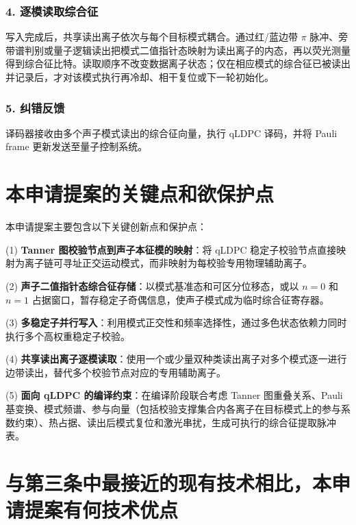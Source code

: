 \documentclass[12pt,a4paper]{article}
\begin{document}
\subsubsection{4. 逐模读取综合征}
写入完成后，共享读出离子依次与每个目标模式耦合。通过红/蓝边带 $\pi$ 脉冲、旁带谱判别或量子逻辑读出把模式二值指针态映射为读出离子的内态，再以荧光测量得到综合征比特。读取顺序不改变数据离子状态；仅在相应模式的综合征已被读出并记录后，才对该模式执行再冷却、相干复位或下一轮初始化。

\subsubsection{5. 纠错反馈}
译码器接收由多个声子模式读出的综合征向量，执行 qLDPC 译码，并将 Pauli frame 更新发送至量子控制系统。

\section{本申请提案的关键点和欲保护点}

本申请提案主要包含以下关键创新点和保护点：

(1) \textbf{Tanner 图校验节点到声子本征模的映射}：将 qLDPC 稳定子校验节点直接映射为离子链可寻址正交运动模式，而非映射为每校验专用物理辅助离子。

(2) \textbf{声子二值指针态综合征存储}：以模式基准态和可区分位移态，或以 $n=0$ 和 $n=1$ 占据窗口，暂存稳定子奇偶信息，使声子模式成为临时综合征寄存器。

(3) \textbf{多稳定子并行写入}：利用模式正交性和频率选择性，通过多色状态依赖力同时执行多个高权重稳定子校验。

(4) \textbf{共享读出离子逐模读取}：使用一个或少量双种类读出离子对多个模式逐一进行边带读出，替代多个校验节点对应的专用辅助离子。

(5) \textbf{面向 qLDPC 的编译约束}：在编译阶段联合考虑 Tanner 图重叠关系、Pauli 基变换、模式频谱、参与向量（包括校验支撑集合内各离子在目标模式上的参与系数约束）、热占据、读出后模式复位和激光串扰，生成可执行的综合征提取脉冲表。

\section{与第三条中最接近的现有技术相比，本申请提案有何技术优点}
\end{document}
